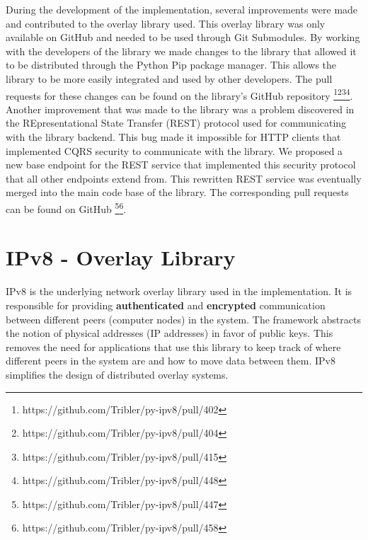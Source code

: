 During the development of the implementation, several improvements were made and contributed to the overlay library used. This overlay library was only available on GitHub and needed to be used through Git Submodules. By working with the developers of the library we made changes to the library that allowed it to be distributed through the Python Pip package manager. This allows the library to be more easily integrated and used by other developers. The pull requests for these changes can be found on the library's GitHub repository \footnote{https://github.com/Tribler/py-ipv8/pull/402}\footnote{https://github.com/Tribler/py-ipv8/pull/404}\footnote{https://github.com/Tribler/py-ipv8/pull/415}\footnote{https://github.com/Tribler/py-ipv8/pull/448}. Another improvement that was made to the library was a problem discovered in the REpresentational State Transfer (REST) protocol used for communicating with the library backend. This bug made it impossible for HTTP clients that implemented CQRS security to communicate with the library. We proposed a new base endpoint for the REST service that implemented this security protocol that all other endpoints extend from. This rewritten REST service was eventually merged into the main code base of the library. The corresponding pull requests can be found on GitHub \footnote{https://github.com/Tribler/py-ipv8/pull/447}\footnote{https://github.com/Tribler/py-ipv8/pull/458}.

\section{IPv8 - Overlay Library}

IPv8 is the underlying network overlay library used in the implementation. It is responsible for providing \textbf{authenticated} and \textbf{encrypted} communication between different peers (computer nodes) in the system. The framework abstracts the notion of physical addresses (IP addresses) in favor of public keys. This removes the need for applications that use this library to keep track of where different peers in the system are and how to move data between them. IPv8 simplifies the design of distributed overlay systems. 

